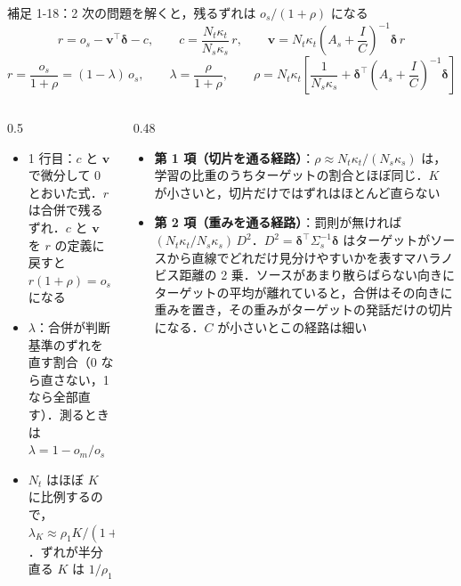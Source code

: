 \begin{frame}{補足 1-18：2 次の問題を解くと，残るずれは $o_s/(1+\rho)$ になる}
  \vspace{-0.4em}
  {\tighteq\footnotesize
  \[ r = o_s - \mathbf v^{\top}\boldsymbol\delta - c,\qquad c = \frac{N_t\kappa_t}{N_s\kappa_s}\,r,\qquad \mathbf v = N_t\kappa_t\left(A_s + \frac IC\right)^{-1}\!\boldsymbol\delta\, r \]
  \[ r = \frac{o_s}{1+\rho} = (1-\lambda)\,o_s,\qquad \lambda = \frac{\rho}{1+\rho},\qquad \rho = N_t\kappa_t\left[\frac{1}{N_s\kappa_s} + \boldsymbol\delta^{\top}\!\left(A_s + \frac IC\right)^{-1}\!\boldsymbol\delta\right] \]}
  \begin{columns}[T,onlytextwidth]
    \begin{column}{0.5\textwidth}
      \begin{itemize}\scriptsize\setlength{\itemsep}{3pt}
        \item 1 行目：$c$ と $\mathbf v$ で微分して 0 とおいた式．$r$ は合併で残るずれ．$c$ と $\mathbf v$ を $r$ の定義に戻すと $r(1+\rho) = o_s$ になる
        \item $\lambda$：合併が判断基準のずれを直す割合（0 なら直さない，1 なら全部直す）．測るときは $\lambda = 1 - o_m/o_s$
        \item $N_t$ はほぼ $K$ に比例するので，$\lambda_K \approx \rho_1 K/(1 + \rho_1 K)$．ずれが半分直る $K$ は $1/\rho_1$
      \end{itemize}
    \end{column}
    \begin{column}{0.48\textwidth}
      \begin{itemize}\scriptsize\setlength{\itemsep}{3pt}
        \item \textbf{第 1 項（切片を通る経路）}：$\rho \approx N_t\kappa_t/(N_s\kappa_s)$ は，学習の比重のうちターゲットの割合とほぼ同じ．$K$ が小さいと，切片だけではずれはほとんど直らない
        \item \textbf{第 2 項（重みを通る経路）}：罰則が無ければ $(N_t\kappa_t/N_s\kappa_s)\,D^2$．$D^2 = \boldsymbol\delta^{\top}\Sigma_s^{-1}\boldsymbol\delta$ はターゲットがソースから直線でどれだけ見分けやすいかを表すマハラノビス距離の 2 乗．ソースがあまり散らばらない向きにターゲットの平均が離れていると，合併はその向きに重みを置き，その重みがターゲットの発話だけの切片になる．$C$ が小さいとこの経路は細い
      \end{itemize}
    \end{column}
  \end{columns}
\end{frame}

